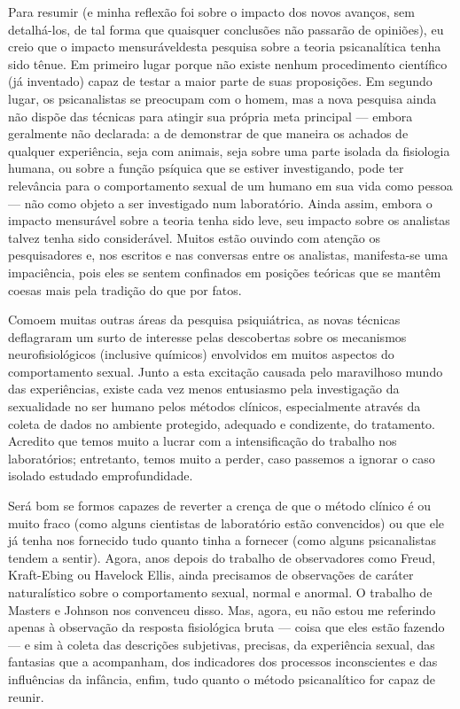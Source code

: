  Para resumir (e minha reflexão foi sobre o impacto dos novos avanços,
sem detalhá-los, de tal forma que quaisquer conclusões não passarão de
opiniões), eu creio que o impacto mensurável\idxsexoppsic[|(] desta pesquisa sobre a
teoria psicanalítica\idxpsicas{} tenha sido tênue. Em primeiro lugar porque não
existe nenhum procedimento científico (já inventado) capaz de testar a
maior parte de suas proposições. Em segundo lugar, os psicanalistas se
preocupam com o homem, mas a nova pesquisa ainda não dispõe das
técnicas para atingir sua própria meta principal --- embora
geralmente não declarada: a de demonstrar de que maneira os achados de
qualquer experiência, seja com animais, seja sobre uma parte isolada da
fisiologia humana, ou sobre a função psíquica que se estiver
investigando, pode ter relevância para o comportamento sexual de um
humano em sua vida como pessoa --- não como objeto a ser investigado num
laboratório. Ainda assim, embora o impacto mensurável sobre a teoria
tenha sido leve, seu impacto sobre os analistas talvez tenha sido
considerável. Muitos estão ouvindo com atenção os pesquisadores e, nos
escritos e nas conversas entre os analistas, manifesta-se uma
impaciência, pois eles se sentem confinados em posições teóricas que se
mantêm coesas mais pela tradição do que por fatos.

 Como\idxsexopmeto[|(] em muitas outras áreas da pesquisa psiquiátrica,\idxcereb{} as novas técnicas
deflagraram um surto de interesse pelas descobertas sobre os mecanismos
neurofisiológicos (inclusive químicos) envolvidos em muitos aspectos do
comportamento sexual. Junto a esta excitação causada pelo maravilhoso
mundo das experiências, existe cada vez menos entusiasmo pela
investigação da sexualidade no ser humano pelos métodos clínicos,
especialmente através da coleta de dados no ambiente protegido,
adequado e condizente, do tratamento. Acredito que temos muito a lucrar
com a intensificação do trabalho nos laboratórios; entretanto, temos
muito a perder, caso passemos a ignorar o caso isolado estudado em\idxsexoppsic[|)]
profundidade.

 Será bom se formos capazes de reverter a crença de que o método clínico
é ou muito fraco (como alguns cientistas de laboratório estão
convencidos) ou que ele já tenha nos fornecido tudo quanto tinha a
fornecer (como alguns psicanalistas tendem a sentir). Agora, anos
depois do trabalho de observadores como Freud,\idxfreud{} Kraft-Ebing\idxkraft{} ou Havelock
Ellis,\idxellis{} ainda precisamos de observações de caráter naturalístico sobre o
comportamento sexual, normal e anormal. O trabalho de Masters\idxmaste{} e Johnson\idxjohns{}
nos convenceu disso. Mas, agora, eu não estou me referindo apenas à
observação da resposta fisiológica bruta --- coisa que eles estão
fazendo --- e sim à coleta das descrições subjetivas, precisas, da
experiência sexual, das fantasias que a acompanham, dos indicadores dos
processos inconscientes e das influências da infância, enfim, tudo
quanto o método psicanalítico for capaz de reunir.

